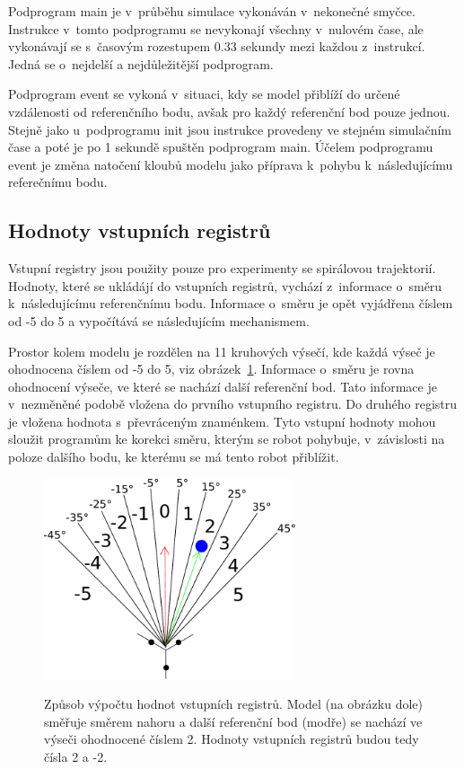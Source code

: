 Podprogram main je v~průběhu simulace vykonáván v~nekonečné smyčce.
Instrukce v~tomto podprogramu se nevykonají všechny v~nulovém čase, ale vykonávají se s~časovým rozestupem 0.33 sekundy mezi každou z~instrukcí.
Jedná se o~nejdelší a nejdůležitější podprogram.

Podprogram event se vykoná v~situaci, kdy se model přiblíží do určené vzdálenosti od referenčního bodu, avšak pro každý referenční bod pouze jednou.
Stejně jako u~podprogramu init jsou instrukce provedeny ve stejném simulačním čase a poté je po 1 sekundě spuštěn podprogram main.
Účelem podprogramu event je změna natočení kloubů modelu jako příprava k~pohybu k~následujícímu referečnímu bodu.

\subsection{Hodnoty vstupních registrů}
Vstupní registry jsou použity pouze pro experimenty se spirálovou trajektorií.
Hodnoty, které se ukládájí do vstupních registrů, vychází z~informace o~směru k~následujícímu referenčnímu bodu.
Informace o~směru je opět vyjádřena číslem od -5 do 5 a vypočítává se následujícím mechanismem.

Prostor kolem modelu je rozdělen na 11 kruhových výsečí, kde každá výseč je ohodnocena číslem od -5 do 5, viz obrázek~\ref{fig:kruhove_vysece}.
Informace o~směru je rovna ohodnocení výseče, ve které se nachází další referenční bod.
Tato informace je v~nezměněné podobě vložena do prvního vstupního registru.
Do druhého registru je vložena hodnota s~převráceným znaménkem.
Tyto vstupní hodnoty mohou sloužit programům ke korekci směru, kterým se robot pohybuje, v~závislosti na poloze dalšího bodu, ke kterému se má tento robot přiblížit.


\begin{figure}[h]
    \centering
    {\includegraphics[width=20em]{obrazky/reference_direction_angles.pdf}}
    \caption[Způsob výpočtu hodnot vstupních registrů]{
    Způsob výpočtu hodnot vstupních registrů.
    Model (na obrázku dole) směřuje směrem nahoru a další referenční bod (modře) se nachází ve výseči ohodnocené číslem 2.
    Hodnoty vstupních registrů budou tedy čísla 2 a -2.
    }
    \label{fig:kruhove_vysece}
\end{figure}

